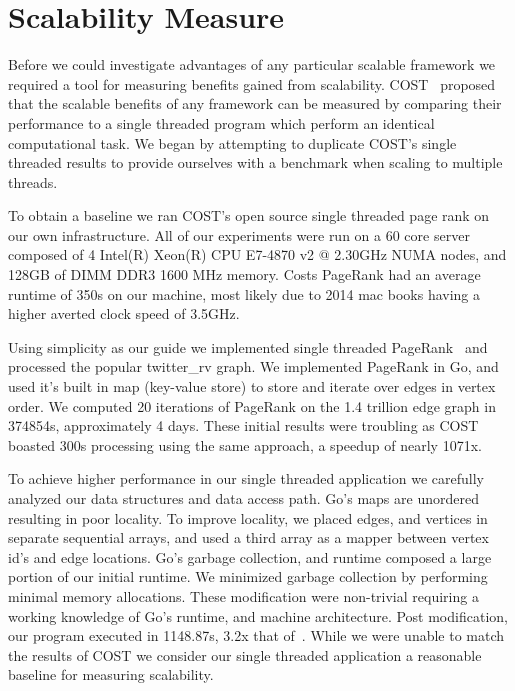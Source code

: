\section{Scalability Measure}
\label{sec:scalability}

Before we could investigate advantages of any particular scalable
framework we required a tool for measuring benefits gained from
scalability. COST~\cite{189908} proposed that the scalable benefits of
any framework can be measured by comparing their performance to a
single threaded program which perform an identical computational task.
We began by attempting to duplicate COST's single threaded results to
provide ourselves with a benchmark when scaling to multiple threads.

To obtain a baseline we ran COST's open source single threaded page
rank on our own infrastructure. All of our experiments were run on a
60 core server composed of 4 Intel(R) Xeon(R) CPU E7-4870 v2 @ 2.30GHz
NUMA nodes, and 128GB of DIMM DDR3 1600 MHz memory. Costs PageRank had
an average runtime of 350s on our machine, most likely due to 2014 mac
books having a higher averted clock speed of 3.5GHz.

Using simplicity as our guide we implemented single threaded
PageRank~\cite{Page98thepagerank} and processed the popular
twitter\_rv graph. We implemented PageRank in Go, and used it's built
in map (key-value store) to store and iterate over edges in vertex
order. We computed 20 iterations of PageRank on the 1.4 trillion edge
graph in 374854s, approximately 4 days. These initial results were
troubling as COST boasted 300s processing using the same
approach, a speedup of nearly 1071x.

To achieve higher performance in our single threaded application we
carefully analyzed our data structures and data access path. Go's maps
are unordered resulting in poor locality. To improve locality, we
placed edges, and vertices in separate sequential arrays, and used a
third array as a mapper between vertex id's and edge locations. Go's
garbage collection, and runtime composed a large portion of our
initial runtime. We minimized garbage collection by performing
minimal memory allocations. These modification were non-trivial
requiring a working knowledge of Go's runtime, and machine
architecture.  Post modification, our program executed in 1148.87s,
3.2x that of~\cite{189908}. While we were unable to match the results
of COST we consider our single threaded application a reasonable
baseline for measuring scalability.

